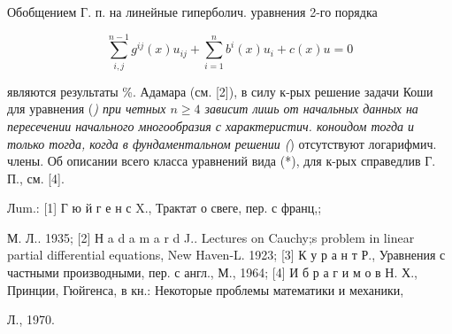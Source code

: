 \documentclass[10pt]{article}
\begin{document}
Обобщением Г. п. на линейные гиперболич. уравнения 2-го порядка



\[

\sum_{i, j}^{n-1} g^{i j}(x) u_{i j}+\sum_{i=1}^{n} b^{i}(x) u_{i}+c(x) u=0

\]



являются результаты \%. Адамара (см. [2]), в силу к-рых решение задачи Коши для уравнения (\textit{) при четных $n \geqslant 4$ зависит лишь от начальных данных на пересечении начального многообразия с характеристич. коноидом тогда и только тогда, когда в фундаментальном решении (}) отсутствуют логарифмич. члены. Об описании всего класса уравнений вида (*), для к-рых справедлив Г. П., см. [4].



Лum.: [1] Г ю й г е н с X., Трактат о свеге, пер. с франц,;

М. Л.. 1935; [2] Н a d a m a r d J.. Lectures on Cauchy;s problem in linear partial differential equations, New Haven-L. 1923; [3] К у р а н т Р., Уравнения с частными производными, пер. с англ., М., 1964; [4] И б р а г и м о в Н. Х., Принции, Гюйгенса, в кн.: Некоторые проблемы математики и механики,

Л., 1970.
\end{document}
